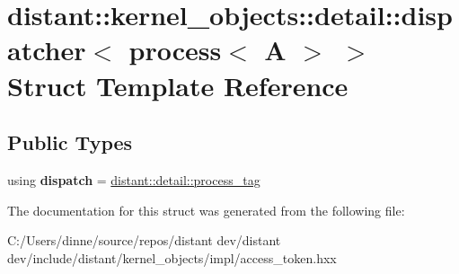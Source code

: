 \hypertarget{structdistant_1_1kernel__objects_1_1detail_1_1dispatcher_3_01process_3_01_a_01_4_01_4}{}\section{distant\+:\+:kernel\+\_\+objects\+:\+:detail\+:\+:dispatcher$<$ process$<$ A $>$ $>$ Struct Template Reference}
\label{structdistant_1_1kernel__objects_1_1detail_1_1dispatcher_3_01process_3_01_a_01_4_01_4}
\subsection*{Public Types}
\begin{DoxyCompactItemize}
\item 
\mbox{\label{structdistant_1_1kernel__objects_1_1detail_1_1dispatcher_3_01process_3_01_a_01_4_01_4_a6670f8e129f24d1a1dd143dcda0b625e}} 
using {\bfseries dispatch} = \mbox{\hyperlink{classdistant_1_1detail_1_1process__tag}{distant\+::detail\+::process\+\_\+tag}}
\end{DoxyCompactItemize}


The documentation for this struct was generated from the following file\+:\begin{DoxyCompactItemize}
\item 
C\+:/\+Users/dinne/source/repos/distant dev/distant dev/include/distant/kernel\+\_\+objects/impl/access\+\_\+token.\+hxx\end{DoxyCompactItemize}
